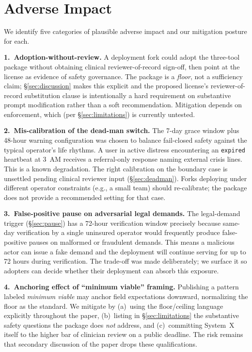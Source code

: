 \documentclass[letterpaper]{article} %
\begin{document}
\section*{Adverse Impact}

We identify five categories of plausible adverse impact and our mitigation posture for each.

\noindent\textbf{1.~Adoption-without-review.} A deployment fork could adopt the three-tool package without obtaining clinical reviewer-of-record sign-off, then point at the license as evidence of safety governance. The package is a \emph{floor}, not a sufficiency claim; \S\ref{sec:discussion} makes this explicit and the proposed license's reviewer-of-record substitution clause is intentionally a hard requirement on substantive prompt modification rather than a soft recommendation. Mitigation depends on enforcement, which (per \S\ref{sec:limitations}) is currently untested.

\noindent\textbf{2.~Mis-calibration of the dead-man switch.} The 7-day grace window plus 48-hour warning configuration was chosen to balance fail-closed safety against the typical operator's life rhythms. A user in active distress encountering an \texttt{expired} heartbeat at 3~AM receives a referral-only response naming external crisis lines. This is a known degradation. The right calibration on the boundary case is unsettled pending clinical reviewer input (\S\ref{sec:deadman}). Forks deploying under different operator constraints (e.g., a small team) should re-calibrate; the package does not provide a recommended setting for that case.

\noindent\textbf{3.~False-positive pause on adversarial legal demands.} The legal-demand trigger (\S\ref{sec:pause}) has a 72-hour verification window precisely because same-day verification by a single uninsured operator would frequently produce false-positive pauses on malformed or fraudulent demands. This means a malicious actor can issue a fake demand and the deployment will continue serving for up to 72 hours during verification. The trade-off was made deliberately; we surface it so adopters can decide whether their deployment can absorb this exposure.

\noindent\textbf{4.~Anchoring effect of ``minimum viable'' framing.} Publishing a pattern labeled \emph{minimum viable} may anchor field expectations downward, normalizing the floor as the standard. We mitigate by (a)~using the floor/ceiling language explicitly throughout the paper, (b)~listing in \S\ref{sec:limitations} the substantive safety questions the package does \emph{not} address, and (c)~committing System~X itself to the higher bar of clinician review on a public deadline. The risk remains that secondary discussion of the paper drops these qualifications.
\end{document}
